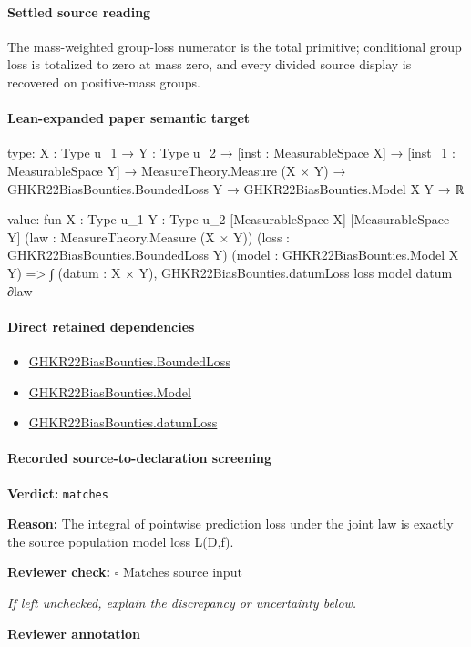\documentclass[10pt]{article}
\newcommand{\reviewerbox}{%
  \par\noindent\fbox{\parbox{0.96\linewidth}{\rule{0pt}{0.38in}}}\par
}
\newcommand{\reviewmatch}[1]{%
  \par\noindent\textbf{Reviewer check:} $\square$\; #1\par
  \noindent\emph{If left unchecked, explain the discrepancy or uncertainty below.}\par
}
\begin{document}
\paragraph{Settled source reading}
The mass-\allowbreak{}weighted group-\allowbreak{}loss numerator is the total primitive;\allowbreak{} conditional group loss is totalized to zero at mass zero, and every divided source display is recovered on positive-\allowbreak{}mass groups.\allowbreak{}

\paragraph{Lean-expanded paper semantic target}
\begin{ReviewVerbatim}
type:
{X : Type u_1} →
  {Y : Type u_2} →
    [inst : MeasurableSpace X] →
      [inst_1 : MeasurableSpace Y] →
        MeasureTheory.Measure (X × Y) → GHKR22BiasBounties.BoundedLoss Y → GHKR22BiasBounties.Model X Y → ℝ

value:
fun {X : Type u_1} {Y : Type u_2} [MeasurableSpace X] [MeasurableSpace Y] (law : MeasureTheory.Measure (X × Y))
    (loss : GHKR22BiasBounties.BoundedLoss Y) (model : GHKR22BiasBounties.Model X Y) =>
  ∫ (datum : X × Y), GHKR22BiasBounties.datumLoss loss model datum ∂law
\end{ReviewVerbatim}

\paragraph{Direct retained dependencies}
\begin{itemize}\raggedright
\item \hyperlink{paper-prerequisite-ef6c319b0770dad4}{GHKR22\allowbreak{}Bias\allowbreak{}Bounties.\allowbreak{}Bounded\allowbreak{}Loss}
\item \hyperlink{paper-prerequisite-333127605c12eba8}{GHKR22\allowbreak{}Bias\allowbreak{}Bounties.\allowbreak{}Model}
\item \hyperlink{governing-declaration-ec78291fd8568d48}{GHKR22\allowbreak{}Bias\allowbreak{}Bounties.\allowbreak{}datum\allowbreak{}Loss}
\end{itemize}
\paragraph{Recorded source-to-declaration screening}
\textbf{Verdict:} \texttt{matches}
\\
{\raggedright
\textbf{Reason:} The integral of pointwise prediction loss under the joint law is exactly the source population model loss L(D,f).\allowbreak{}
\par}
\reviewmatch{Matches source input}
\noindent\textbf{Reviewer annotation}\par
\reviewerbox
\clearpage
\hypertarget{paper-prerequisite-b5889905f0c62bd2}{}
\end{document}
